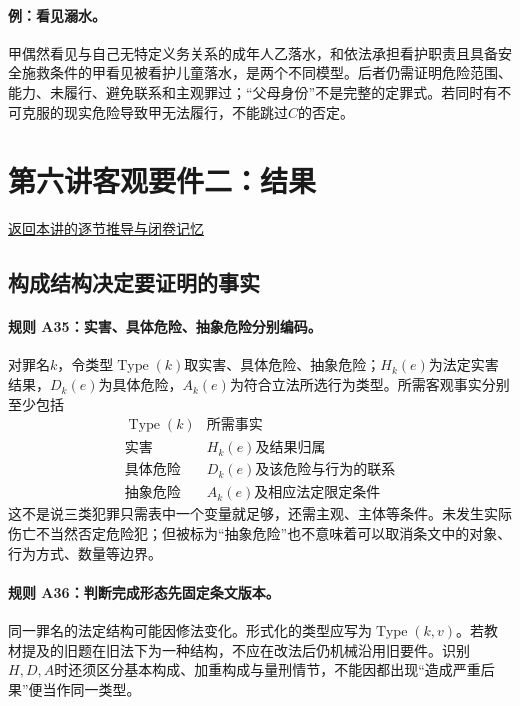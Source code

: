 \paragraph{例：看见溺水。}
甲偶然看见与自己无特定义务关系的成年人乙落水，和依法承担看护职责且具备安全施救条件的甲看见被看护儿童落水，是两个不同模型。后者仍需证明危险范围、能力、未履行、避免联系和主观罪过；“父母身份”不是完整的定罪式。若同时有不可克服的现实危险导致甲无法履行，不能跳过$C$的否定。

\section{第六讲\quad 客观要件二：结果}

\label{ref:lecture:06}

\noindent\hyperref[lecture:06]{返回本讲的逐节推导与闭卷记忆}

\subsection{构成结构决定要证明的事实}
\paragraph{规则 A35：实害、具体危险、抽象危险分别编码。}
对罪名$k$，令类型$\operatorname{Type}(k)$取实害、具体危险、抽象危险；$H_k(e)$为法定实害结果，$D_k(e)$为具体危险，$A_k(e)$为符合立法所选行为类型。所需客观事实分别至少包括
\[
\begin{array}{c|c}
\operatorname{Type}(k)&\text{所需事实}\\\hline
\text{实害}&H_k(e)\text{及结果归属}\\
\text{具体危险}&D_k(e)\text{及该危险与行为的联系}\\
\text{抽象危险}&A_k(e)\text{及相应法定限定条件}
\end{array}
\]
这不是说三类犯罪只需表中一个变量就足够，还需主观、主体等条件。未发生实际伤亡不当然否定危险犯；但被标为“抽象危险”也不意味着可以取消条文中的对象、行为方式、数量等边界。

\paragraph{规则 A36：判断完成形态先固定条文版本。}
同一罪名的法定结构可能因修法变化。形式化的类型应写为$\operatorname{Type}(k,v)$。若教材提及的旧题在旧法下为一种结构，不应在改法后仍机械沿用旧要件。识别$H,D,A$时还须区分基本构成、加重构成与量刑情节，不能因都出现“造成严重后果”便当作同一类型。

